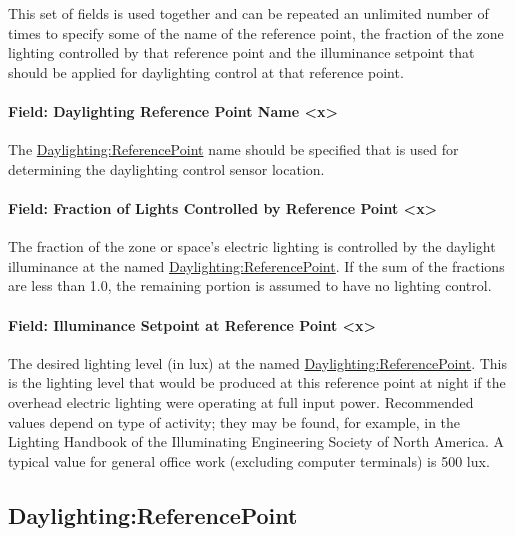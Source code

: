 This set of fields is used together and can be repeated an unlimited number of times to specify some of the name of the reference point, the fraction of the zone lighting controlled by that reference point and the illuminance setpoint that should be applied for daylighting control at that reference point.

\paragraph{Field: Daylighting Reference Point Name <x>}\label{field-daylighting-reference-point-name-x}

The \hyperref[daylightingreferencepoint-000]{Daylighting:ReferencePoint} name should be specified that is used for determining the daylighting control sensor location.

\paragraph{Field: Fraction of Lights Controlled by Reference Point <x>}\label{field-fraction-of-lights-controlled-by-reference-point-x}

The fraction of the zone or space's electric lighting is controlled by the daylight illuminance at the named \hyperref[daylightingreferencepoint-000]{Daylighting:ReferencePoint}. If the sum of the fractions are less than 1.0, the remaining portion is assumed to have no lighting control.

\paragraph{Field: Illuminance Setpoint at Reference Point <x>}\label{field-illuminance-setpoint-at-reference-point-x}

The desired lighting level (in lux) at the named \hyperref[daylightingreferencepoint-000]{Daylighting:ReferencePoint}. This is the lighting level that would be produced at this reference point at night if the overhead electric lighting were operating at full input power. Recommended values depend on type of activity; they may be found, for example, in the Lighting Handbook of the Illuminating Engineering Society of North America. A typical value for general office work (excluding computer terminals) is 500 lux.

\subsection{Daylighting:ReferencePoint}\label{daylightingreferencepoint-000}

